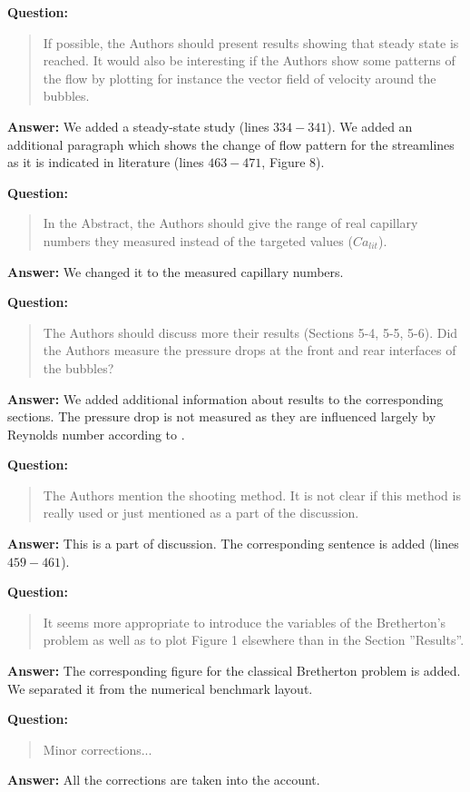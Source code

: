 \documentclass{article}
\begin{document}
\textbf{Question:} 
\begin{quotation}
 If possible, the Authors should present results showing that steady state is reached. It would
also
be interesting if the Authors show some patterns of the flow by plotting for instance the vector
ﬁeld
of velocity around the bubbles.
\end{quotation}

\textbf{Answer:} We added a steady-state study (lines $334-341$). We added an additional
paragraph which shows the change of flow pattern for the
streamlines as it is indicated in literature (lines $463-471$, Figure 8).

\textbf{Question:}
\begin{quotation}
In the Abstract, the Authors should give the range of real capillary numbers they measured instead
of the targeted values ($Ca_{lit}$).
\end{quotation}

\textbf{Answer:} We changed it to the measured capillary numbers.

\textbf{Question:} 
\begin{quotation}
The Authors should discuss more their results (Sections 5-4, 5-5, 5-6). Did the Authors measure the
pressure drops at the front and rear interfaces of the bubbles?
\end{quotation}

\textbf{Answer:} We added additional information about results to the corresponding sections. The
pressure drop is not measured as they are influenced largely by Reynolds number according to
\citet{heil-bretherton}.

\textbf{Question:}
\begin{quotation}
The Authors mention the shooting method. It is not clear if this method is really used or just
mentioned as a part of the discussion.
\end{quotation}

\textbf{Answer:} This is a part of discussion. The corresponding
sentence is added (lines $459-461$).

\textbf{Question:}
\begin{quotation}
It seems more appropriate to introduce the variables of the Bretherton’s problem as well as to plot
Figure 1 elsewhere than in the Section ”Results”.
\end{quotation}

\textbf{Answer:} The corresponding figure for the classical Bretherton problem is added. We
separated it from the numerical benchmark layout.

\textbf{Question:}
\begin{quotation}
Minor corrections...
\end{quotation}

\textbf{Answer:} All the corrections are taken into the account.



\end{document}
